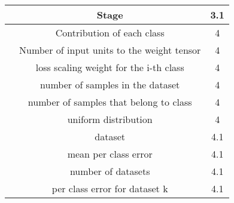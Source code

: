 \documentclass[preprint,12pt,3p]{elsarticle}
\begin{document}
\begin{table*}[htpb]
\begin{adjustbox}{width=0.71 \linewidth}
\begin{tabularx}{1.55 \textwidth}{|c|C|c|}
    \hline
       & Stage & 3.1 \\
    \hline
     & Contribution of each class & 4 \\
    \hline
       & Number of input units to the weight tensor & 4 \\
    \hline
     & loss scaling weight for the i-th class & 4 \\
    \hline
       & number of samples in the dataset & 4 \\
    \hline
     & number of samples that belong to class  & 4 \\
    \hline
       & uniform distribution & 4 \\
    \hline
       & dataset & 4.1 \\
    \hline
     & mean per class error & 4.1 \\
    \hline
       & number of datasets & 4.1 \\
    \hline
     & per class error for dataset k & 4.1 \\
    \hline


    \end{tabularx}
    \end{adjustbox}
  \label{appendtab:1}

\end{table*}%




\end{document}

